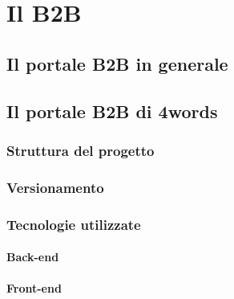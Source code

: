 \chapter{Il B2B}
\section{Il portale B2B in generale}
\section{Il portale B2B di 4words}
\subsection{Struttura del progetto}
\subsection{Versionamento}
\subsection{Tecnologie utilizzate}
\subsubsection{Back-end}
\subsubsection{Front-end}